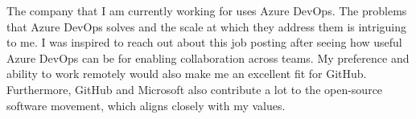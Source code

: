 The company that I am currently working for uses Azure DevOps. The problems that Azure DevOps solves and the scale at which they address them is intriguing to me.  I was inspired to reach out about this job posting after seeing how useful Azure DevOps can be for enabling collaboration across teams.  My preference and ability to work remotely would also make me an excellent fit for GitHub.  Furthermore, GitHub and Microsoft also contribute a lot to the open-source software movement, which aligns closely with my values.